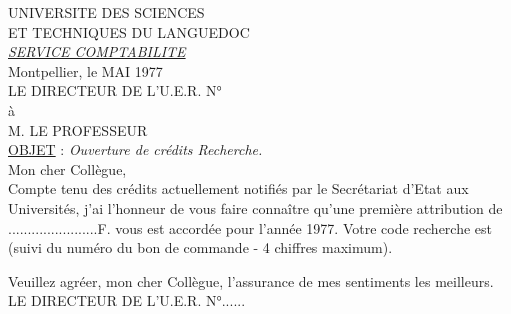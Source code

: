 UNIVERSITE DES SCIENCES\\
ET TECHNIQUES DU LANGUEDOC\\
\uline{\textit{SERVICE COMPTABILITE}}\\

Montpellier, le  MAI 1977\\

LE DIRECTEUR DE L'U.E.R. N° \\
à\\
M. LE PROFESSEUR \\

\uline{OBJET} : \textit{Ouverture de crédits \textquotedbl{}Recherche\textquotedbl{}.}\\

Mon cher Collègue,\\

Compte tenu des crédits actuellement notifiés par le Secrétariat d'Etat aux Universités, j'ai l'honneur de vous faire connaître qu'une première attribution de .......................F. vous est accordée pour l'année 1977. Votre code recherche est  (suivi du numéro du bon de commande - 4 chiffres maximum).

Veuillez agréer, mon cher Collègue, l'assurance de mes sentiments les meilleurs.\\

LE DIRECTEUR DE L'U.E.R. N°......\\
\\
